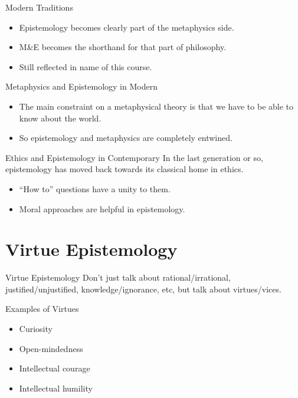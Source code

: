 \documentclass[
  17pt,
  letterpaper,
  ignorenonframetext,
  aspectratio=169,
  handout]{beamer}
\providecommand{\tightlist}{%
  \setlength{\itemsep}{0pt}\setlength{\parskip}{0pt}}\usepackage{longtable,booktabs,array}
\begin{document}
\begin{frame}{Modern Traditions}
\protect\hypertarget{modern-traditions-1}{}
\begin{itemize}[<+->]
\tightlist
\item
  Epistemology becomes clearly part of the metaphysics side.
\item
  M\&E becomes the shorthand for that part of philosophy.
\item
  Still reflected in name of this course.
\end{itemize}
\end{frame}

\begin{frame}{Metaphysics and Epistemology in Modern}
\protect\hypertarget{metaphysics-and-epistemology-in-modern}{}
\begin{itemize}[<+->]
\tightlist
\item
  The main constraint on a metaphysical theory is that we have to be
  able to know about the world.
\item
  So epistemology and metaphysics are completely entwined.
\end{itemize}
\end{frame}

\begin{frame}{Ethics and Epistemology in Contemporary}
\protect\hypertarget{ethics-and-epistemology-in-contemporary}{}
In the last generation or so, epistemology has moved back towards its
classical home in ethics.

\begin{itemize}[<+->]
\tightlist
\item
  ``How to'' questions have a unity to them.
\item
  Moral approaches are helpful in epistemology.
\end{itemize}
\end{frame}

\hypertarget{virtue-epistemology}{%
\section{Virtue Epistemology}\label{virtue-epistemology}}

\begin{frame}{Virtue Epistemology}
\protect\hypertarget{virtue-epistemology-1}{}
Don't just talk about rational/irrational, justified/unjustified,
knowledge/ignorance, etc, but talk about virtues/vices.
\end{frame}

\begin{frame}{Examples of Virtues}
\protect\hypertarget{examples-of-virtues}{}
\begin{itemize}[<+->]
\tightlist
\item
  Curiosity
\item
  Open-mindedness
\item
  Intellectual courage
\item
  Intellectual humility
\end{itemize}
\end{frame}
\end{document}
